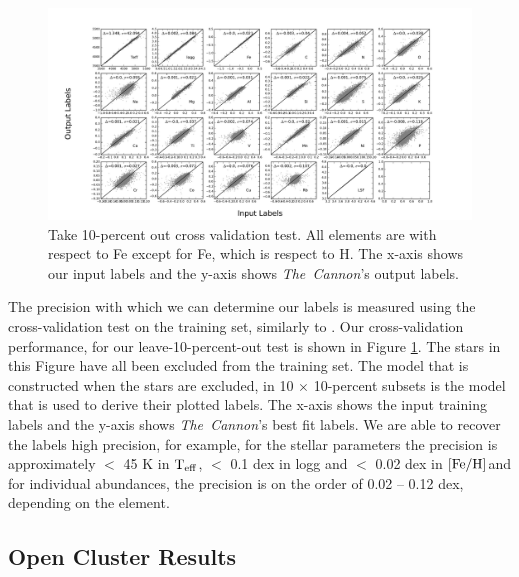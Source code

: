 \documentclass[14pt, preprint2]{aastex6}
\newcommand{\project}[1]{\textsl{#1}}
\newcommand{\tc}{\project{The~Cannon}}
\newcommand{\teff}{\mbox{$\rm T_{eff}$}}
\newcommand{\feh}{\mbox{$\rm [Fe/H]$}}
\begin{document}

\begin{figure}[h!]
\includegraphics[scale=0.45]{crossval_5026.pdf} 
  \caption{Take 10-percent out cross validation test. All elements are with respect to Fe except for Fe, which is respect to H. The x-axis shows our input labels and the y-axis shows \tc's output labels. }
\label{fig:cross}
\end{figure}

The precision with which we can determine our labels is measured using the cross-validation test on the training set, similarly to \citet{Ness2015, Ho2016, Casey2016}. Our cross-validation performance, for our leave-10-percent-out test is shown in Figure \ref{fig:cross}. The stars in this Figure have all been excluded from the training set. The model that is constructed when the stars are excluded, in 10 $\times$ 10-percent subsets is the model that is used to derive their plotted labels. The x-axis shows the input training labels and the y-axis shows \tc's best fit labels. We are able to recover the labels high precision, for example, for the stellar parameters the precision is approximately $<$ 45 K in \teff, $<$ 0.1 dex in logg and $<$ 0.02 dex in \feh and for individual abundances, the precision is on the order of 0.02 -- 0.12 dex, depending on the element. 

\subsection{Open Cluster Results} 
\end{document}
